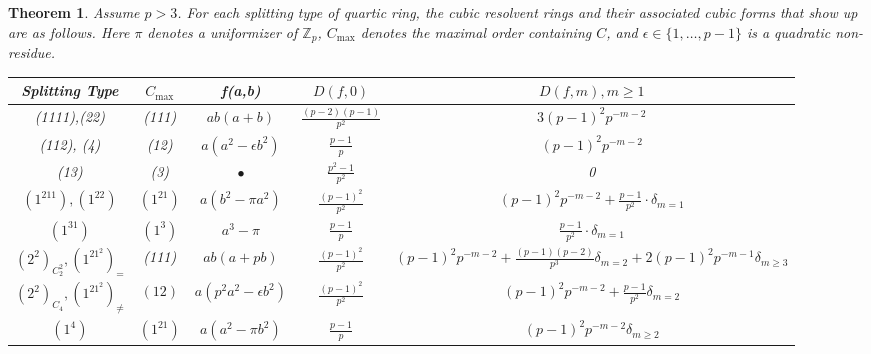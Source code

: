 \documentclass{article}
\def\Z{{\mathbb Z}}
\def\Z{{\mathbb Z}}
\newtheorem{theorem}{Theorem}[section]
\begin{document}
\begin{theorem}\label{thm:sptypeptcounts}
    Assume $p>3$. For each splitting type of quartic ring, the cubic resolvent rings and their associated cubic forms that show up are as follows. Here $\pi$ denotes a uniformizer of $\Z_p$, $C_{\max}$ denotes the maximal order containing $C$, and $\epsilon\in\{1,\dots,p-1\}$ is a quadratic non-residue.
\vspace{0.2in}
\begin{table}[h]
\centering
\hspace*{-0.5cm}
 \begin{tabular}{|c|c|c|c|c|}
  \hline
  \textbf{\textrm{Splitting Type}} & \textbf{ $C_{\max}$} & \textbf{f(a,b)} & \textbf{$D(f,0)$}&  \textbf{$D(f,m), m\geq 1$ } \\
  \hline
  (1111),(22) & (111) & $ab(a+b)$ & $\frac{(p-2)(p-1)}{p^2}$ & $3(p-1)^2p^{-m-2}$ \\
  \hline
  (112), (4) & (12) & $a(a^2-\epsilon b^2)$  & $\frac{p-1}{p}$ &  $(p-1)^2p^{-m-2}$\\
  \hline
   (13) & (3)&  $\bullet$   & $\frac{p^2-1}{p^2}$ &  0\\
   \hline
   $(1^211),(1^22)$ & $(1^21)$ & $a(b^2-\pi a^2)$ & $\frac{(p-1)^2}{p^2}$ & $(p-1)^2p^{-m-2} +\frac{p-1}{p^2}\cdot\delta_{m=1}$\\
   \hline
   $(1^31)$ & $(1^3)$ & $a^3-\pi$ & $\frac{p-1}{p}$ & $\frac{p-1}{p^2}\cdot\delta_{m=1}$\\
   \hline
   $(2^2)_{C_2^2},(1^21^2)_{=}$ & (111) & $ab(a+pb)$ & $\frac{(p-1)^2}{p^2}$ & $(p-1)^2p^{-m-2} + \frac{(p-1)(p-2)}{p^3}\delta_{m=2}+2(p-1)^2p^{-m-1}\delta_{m\geq 3}$\\
   \hline
      $(2^2)_{C_4},(1^21^2)_{\neq}$ & $(12)$ & $a(p^2a^2-\epsilon b^2)$ & $\frac{(p-1)^2}{p^2}$ & $(p-1)^2p^{-m-2} + \frac{p-1}{p^2}\delta_{m=2}$ \\
  \hline
   $(1^4)$ & $(1^21)$ & $a(a^2-\pi b^2)$ & $\frac{p-1}{p}$ & $(p-1)^2p^{-m-2}\delta_{m\geq 2}$ \\
   \hline
\end{tabular}
\end{table}
\end{theorem}
\end{document}
